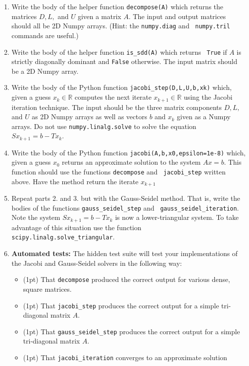 \documentclass[12pt]{article}
\begin{document}
\begin{enumerate}
\item Write the body of the helper function {\tt decompose(A)} which returns the
  matrices $D, L,$ and $U$ given a matrix $A$. The input and output matrices
  should all be 2D Numpy arrays. (Hint: the {\tt numpy.diag} and {\tt
    numpy.tril} commands are useful.)
\item Write the body of the helper function {\tt is\_sdd(A)} which returns {\tt
    True} if $A$ is strictly diagonally dominant and {\tt False} otherwise. The
  input matrix should be a 2D Numpy array.
\item Write the body of the Python function {\tt jacobi\_step(D,L,U,b,xk)}
  which, given a guess $x_k \in \mathbb{R}$ computes the next iterate $x_{k+1}
  \in \mathbb{R}$ using the Jacobi iteration technique. The input should be the
  three matrix components $D,L,$ and $U$ as 2D Numpy arrays as well as vectors
  $b$ and $x_k$ given as a Numpy arrays. Do not use {\tt numpy.linalg.solve} to
  solve the equation $Sx_{k+1} = b - Tx_k$.
\item Write the body of the Python function {\tt jacobi(A,b,x0,epsilon=1e-8)}
  which, given a guess $x_0$ returns an approximate solution to the system $Ax =
  b$. This function should use the functions {\tt decompose} and {\tt
    jacobi\_step} written above. Have the method return the iterate $x_{k+1}$
\item Repeat parts 2. and 3. but with the Gauss-Seidel method. That is, write
  the bodies of the functions {\tt gauss\_seidel\_step} and {\tt
    gauss\_seidel\_iteration}. Note the system $Sx_{k+1} = b - Tx_k$ is now a
  lower-triangular system. To take advantage of this situation use the function
  {\tt scipy.linalg.solve\_triangular}.
\item {\bf Automated tests:} The hidden test suite will test your
  implementations of the Jacobi and Gauss-Seidel solvers in the following way:
  \begin{itemize}
  \item (1pt) That {\tt decompose} produced the correct output for various
    dense, square matrices.
  \item (1pt) That {\tt jacobi\_step} produces the correct output for a simple
    tri-diagonal matrix $A$.
  \item (1pt) That {\tt gauss\_seidel\_step} produces the correct output for a
    simple tri-diagonal matrix $A$.
  \item (1pt) That {\tt jacobi\_iteration} converges to an approximate solution

\end{itemize}
\end{enumerate}
\end{document}
